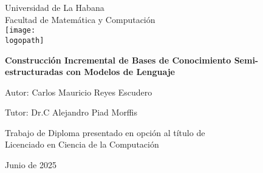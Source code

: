 \newcommand{\logopath}{figures/uhlogo.pdf} %
\newcommand{\thetitletext}{Construcción Incremental de Bases de Conocimiento Semi-estructuradas con Modelos de Lenguaje}
\newcommand{\theauthortext}{Carlos Mauricio Reyes Escudero}
\newcommand{\theadvisortext}{Dr.C Alejandro Piad Morffis}
\newcommand{\thedate}{Junio de 2025}
\newcommand{\theuniversitytext}{Universidad de La Habana}
\newcommand{\thefacultytext}{Facultad de Matemática y Computación}
\newcommand{\thedegreetext}{Trabajo de Diploma presentado en opción al título de \\ Licenciado en Ciencia de la Computación}

\begin{titlingpage}
\centering %

{\large \theuniversitytext} \\
{\large \thefacultytext} \\ %
\vspace{0.5cm} %
\texttt{[image: \\logopath]} %

\vspace{2cm} %

{\LARGE \bfseries \thetitletext \par} %
\vspace{2cm} %

{\Large Autor: \theauthortext \par} %
\vspace{0.5cm} %
{\Large Tutor: \theadvisortext \par} %


\vfill

{\large \thedegreetext \par} %
\vspace{1cm} %

{\large \thedate \par}
\vspace{1cm} %
\end{titlingpage}